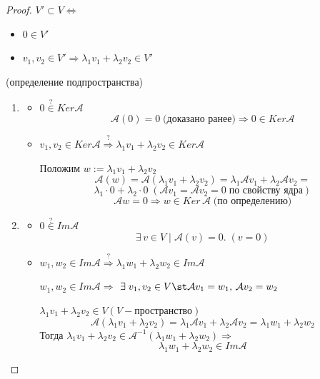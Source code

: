 \begin{proof}

    $V' \subset V \Leftrightarrow$
    \begin{itemize}
        \item $0 \in V'$
        \item $v_1, v_2 \in V' \Rightarrow \lambda_1 v_1 + \lambda_2 v_2 \in V'$ 
    \end{itemize}

    (определение подпространства)

    \begin{enumerate}
        \item 
        \begin{itemize}
            \item $0 \overset{?}{\in} Ker \mathcal{A}$
            \[
            \mathcal{A}(0) = 0 \; \text{(доказано ранее)} \Rightarrow 0 \in Ker \mathcal{A}
            \]
            \item $v_1, v_2 \in Ker \mathcal{A} \overset{?}{\Rightarrow} \lambda_1 v_1 + \lambda_2 v_2 \in Ker \mathcal{A}$

            Положим $w := \lambda_1 v_1 + \lambda_2 v_2$
            \[
            \mathcal{A}(w) = \mathcal{A}(\lambda_1 v_1 + \lambda_2 v_2) = \lambda_1 \mathcal{A}v_1 + \lambda_2 \mathcal{A} v_2 =
            \]
            \[
            \lambda_1 \cdot 0 + \lambda_2 \cdot 0 \; (\mathcal{A}v_1 = \mathcal{A}v_2 = 0 \; \text{по свойству ядра})
            \]
            \[
            \mathcal{A}w = 0 \Rightarrow w \in Ker \, \mathcal{A} \; \text{(по определению)}
            \]
        \end{itemize} 
        \item 
        \begin{itemize}
            \item $0 \overset{?}{\in} Im \mathcal{A}$
            \[
            \exists \, v \in V \; | \; \mathcal{A}(v) = 0. \; (v = 0)
            \]
            \item $w_1, w_2 \in Im \mathcal{A} \overset{?}{\Rightarrow} \lambda_1 w_1 + \lambda_2 w_2 \in Im \mathcal{A}$
            
            $w_1, w_2 \in Im \mathcal{A} \Rightarrow$
            $\exists \; v_1, v_2 \in V \st \mathcal{A}v_1 = w_1, \, \mathcal{A}v_2 = w_2$
            
            $\lambda_1 v_1 + \lambda_2 v_2 \in V (V - \text{пространство})$
            \[
                \mathcal{A}(\lambda_1 v_1 + \lambda_2 v_2) = \lambda_1 \mathcal{A} v_1 + \lambda_2 \mathcal{A} v_2 = \lambda_1 w_1 + \lambda_2 w_2
            \]
            Тогда $\lambda_1 v_1 + \lambda_2 v_2 \in \mathcal{A}^{-1}(\lambda_1 w_1 + \lambda_2 w_2) \Rightarrow$
            \[ \lambda_1 w_1 + \lambda_2 w_2 \in Im \mathcal{A}\]
        \end{itemize}
    \end{enumerate}
\end{proof}

